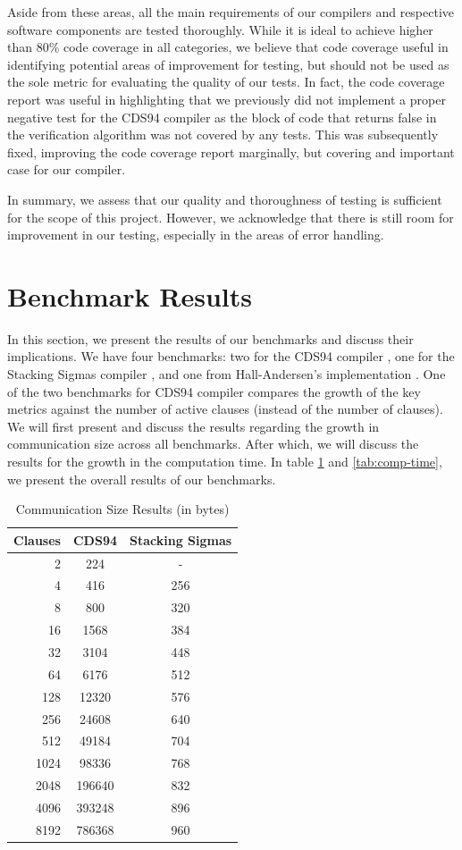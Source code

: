 Aside from these areas, all the main requirements of our compilers and respective 
software components are tested thoroughly. While it is ideal to achieve higher 
than 80\% code coverage in all categories, we believe that code coverage useful in 
identifying potential areas of improvement for testing, but should not be used as the
sole metric for evaluating the quality of our tests. In fact, the code coverage report
was useful in highlighting that we previously did not implement a proper 
negative test for the CDS94 compiler as the block of code that returns false in 
the verification algorithm was not covered by any tests. This was subsequently fixed, 
improving the code coverage report marginally, but covering and important case 
for our compiler.

In summary, we assess that our quality and thoroughness of testing is sufficient 
for the scope of this project. However, we acknowledge that there is still room for
improvement in our testing, especially in the areas of error handling. 
\section{Benchmark Results}\label{eval:benchmarks}
In this section, we present the results of our benchmarks and discuss their 
implications. We have four benchmarks: two for the CDS94 compiler \cite{CDS94}, 
one for the Stacking Sigmas compiler \cite{StackingSigmas}, and one from Hall-Andersen's implementation \cite{MHAStackSig}. One of the two benchmarks for CDS94 compiler compares 
the growth of the key metrics against the number of active clauses (instead of the 
number of clauses). We will first present and discuss the results regarding the 
growth in communication size across all benchmarks. After which, we will discuss
the results for the growth in the computation time. In table \ref{tab:comm-size} and 
\ref{tab:comp-time}, we present the overall results of our benchmarks.

\begin{table}[H]
  \centering\caption{Communication Size Results (in bytes)} 
  \label{tab:comm-size}
  \begin{tabular}{rcc}
    \toprule
    \textbf{Clauses} & \textbf{CDS94} & \textbf{Stacking Sigmas} \\
    \midrule
    2 & 224 & - \\
    4 & 416 & 256 \\
    8 & 800 & 320 \\
    16 & 1568 & 384 \\
    32 & 3104 & 448 \\
    64 & 6176 & 512 \\
    128 & 12320 & 576 \\
    256 & 24608 & 640 \\
    512 & 49184 & 704 \\
    1024 & 98336 & 768 \\
    2048 & 196640 & 832 \\
    4096 & 393248 & 896 \\
    8192 & 786368 & 960 \\
    \bottomrule
  \end{tabular}
\end{table}

